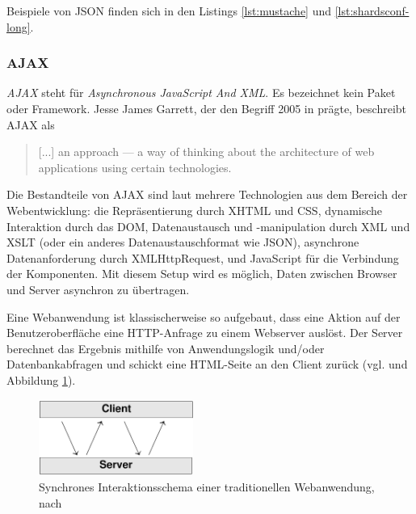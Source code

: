 Beispiele von JSON finden sich in den Listings \ref{lst:mustache} und \ref{lst:shardsconf-long}.


\subsubsection{AJAX}
\label{subsec:ajax}

\textit{AJAX} steht für \textit{Asynchronous JavaScript And XML}. Es bezeichnet kein Paket oder Framework. Jesse James Garrett, der den Begriff 2005 in \cite{ajax:approach} prägte, beschreibt AJAX als 

\begin{quote}
[...] an approach — a way of thinking about the architecture of web applications using certain technologies.
\end{quote}

Die Bestandteile von AJAX sind laut \cite{ajax:approach} mehrere Technologien aus dem Bereich der Webentwicklung: die Repräsentierung durch XHTML und CSS, dynamische Interaktion durch das DOM, Datenaustausch und -manipulation durch XML und XSLT (oder ein anderes Datenaustauschformat wie JSON), asynchrone Datenanforderung durch XMLHttpRequest, und JavaScript für die Verbindung der Komponenten. Mit diesem Setup wird es möglich, Daten zwischen Browser und Server asynchron zu übertragen. 

Eine Webanwendung ist klassischerweise so aufgebaut, dass eine Aktion auf der Benutzeroberfläche eine HTTP-Anfrage zu einem Webserver auslöst. Der Server berechnet das Ergebnis mithilfe von Anwendungslogik und/oder Datenbankabfragen und schickt eine HTML-Seite an den Client zurück (vgl. \cite{ajax:approach} und Abbildung \ref{fig:classic-interaction-pattern}). 

\medskip
\begin{figure}[ht] 
 \begin{center}
   \includegraphics[width=0.45\textwidth]{grafik/ajax-classic} 
 \end{center}
 \caption[Synchrones Interaktionsschema einer traditionellen Webanwendung]{Synchrones Interaktionsschema einer traditionellen Webanwendung, nach }
 \label{fig:classic-interaction-pattern} 
\end{figure}


